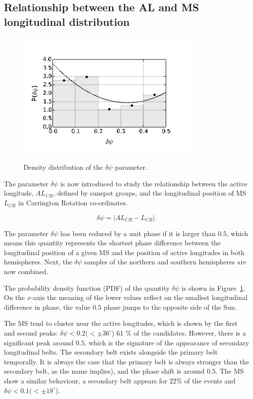 \subsection{Relationship between the AL and MS longitudinal distribution}

\begin{figure}
	\centering
	{\includegraphics[width=90mm]{Chapter4/Figs/stat}}
	{\caption{Density distribution of the $\delta\psi$ parameter. }\label{stat}}
\end{figure}	

The parameter $\delta\psi$ is now introduced to study the relationship between the active longitude, $AL_{CR}$, defined by sunspot groups, and the longitudinal position of MS $L_{CR}$ in Carrington Rotation co-ordinates. 

\begin{equation}
\delta\psi = \left| AL_{CR} - L_{CR}\right|.
\end{equation}

The parameter $\delta\psi$ has been reduced by a unit phase if it is larger than $0.5$, which means this quantity represents the shortest phase difference between the longitudinal position of a given MS and the position of active longitudes in both hemispheres. 
Next, the $\delta\psi$ samples of the northern and southern hemispheres are now combined. 

The probability density function (PDF) of the quantity $\delta\psi$ is shown in Figure~\ref{stat}. On the $x$-axis the meaning of the lower values reflect on the smallest longitudinal difference in phase, the value $0.5$ phase jumps to the opposite side of the Sun.

The MS tend to cluster near the active longitudes, which is shown by the first and second peaks: $\delta\psi< 0.2 (<\pm 36^{\circ}$) 61 \% of the candidates.
However, there is a significant peak around $0.5$, which is the signature of the appearance of secondary longitudinal belts. 
The secondary belt exists alongside the primary belt temporally. 
It is always the case that the primary belt is always stronger than the secondary belt, as the name implies), and the phase shift is around $0.5$.
The MS show a similar behaviour, a secondary belt appears for $22\%$ of the events and $\delta\psi< 0.1 (<\pm 18^{\circ}$).

